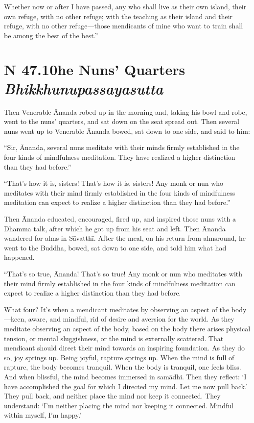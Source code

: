 \documentclass[12pt,openany]{book}%
\newcommand*{\suttatitleacronym}[1]{\smaller[2]{#1}\vspace*{.3em}}
\newcommand*{\suttatitletranslation}[1]{\linebreak{#1}}
\newcommand*{\suttatitleroot}[1]{\linebreak\smaller[2]\itshape{#1}}
\newcommand*{\tocacronym}[1]{\hspace*{-3.3em}{#1}\quad}
\newcommand*{\toctranslation}[1]{#1}
\newcommand*{\tocroot}[1]{(\textit{#1})}
\begin{document}
Whether now or after I have passed, any who shall live as their own island, their own refuge, with no other refuge; with the teaching as their island and their refuge, with no other refuge—those mendicants of mine who want to train shall be among the best of the best.” 

%
\section*{{\suttatitleacronym SN 47.10}{\suttatitletranslation The Nuns’ Quarters }{\suttatitleroot Bhikkhunupassayasutta}}
\addcontentsline{toc}{section}{\tocacronym{SN 47.10} \toctranslation{The Nuns’ Quarters } \tocroot{Bhikkhunupassayasutta}}

Then Venerable Ānanda robed up in the morning and, taking his bowl and robe, went to the nuns’ quarters, and sat down on the seat spread out. Then several nuns went up to Venerable Ānanda bowed, sat down to one side, and said to him: 

“Sir, Ānanda, several nuns meditate with their minds firmly established in the four kinds of mindfulness meditation. They have realized a higher distinction than they had before.” 

“That’s how it is, sisters! That’s how it is, sisters! Any monk or nun who meditates with their mind firmly established in the four kinds of mindfulness meditation can expect to realize a higher distinction than they had before.” 

Then Ānanda educated, encouraged, fired up, and inspired those nuns with a Dhamma talk, after which he got up from his seat and left. Then Ānanda wandered for alms in \textsanskrit{Sāvatthī}. After the meal, on his return from almsround, he went to the Buddha, bowed, sat down to one side, and told him what had happened. 

“That’s so true, Ānanda! That’s so true! Any monk or nun who meditates with their mind firmly established in the four kinds of mindfulness meditation can expect to realize a higher distinction than they had before. 

What four? It’s when a mendicant meditates by observing an aspect of the body—keen, aware, and mindful, rid of desire and aversion for the world. As they meditate observing an aspect of the body, based on the body there arises physical tension, or mental sluggishness, or the mind is externally scattered. That mendicant should direct their mind towards an inspiring foundation. As they do so, joy springs up. Being joyful, rapture springs up. When the mind is full of rapture, the body becomes tranquil. When the body is tranquil, one feels bliss. And when blissful, the mind becomes immersed in \textsanskrit{samādhi}. Then they reflect: ‘I have accomplished the goal for which I directed my mind. Let me now pull back.’ They pull back, and neither place the mind nor keep it connected. They understand: ‘I’m neither placing the mind nor keeping it connected. Mindful within myself, I’m happy.’ 
\end{document}

